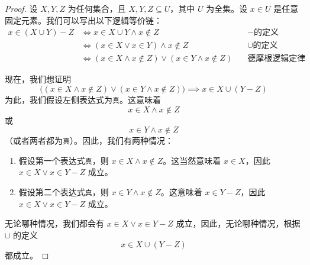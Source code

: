 \begin{proof}
    设 $X,Y,Z$ 为任何集合，且 $X,Y,Z \subseteq U$，其中 $U$ 为全集。设 $x \in U$ 是任意固定元素。我们可以写出以下逻辑等价链：
    \begin{align*}
        x \in (X \cup Y ) - Z &\iff x \in X \cup Y \land x \notin Z &\quad - \text{的定义}\\
        &\iff (x \in X \lor x \in Y ) \land x \notin Z &\quad \cup \text{的定义} \\
        &\iff (x \in X \land x \notin Z) \lor (x \in Y \land x \notin Z) &\quad \text{德摩根逻辑定律} 
    \end{align*}
    
    \setlength{\fboxrule}{2pt}
    \setlength\fboxsep{5mm}
    \begin{center}
    \end{center}
    现在，我们想证明
    \[\big((x \in X \land x \notin Z) \lor (x \in Y \land x \notin Z)\big) \implies x \in X \cup (Y - Z)\]
    为此，我们假设左侧表达式为\verb|真|。这意味着
    \[x \in X \land x \notin Z\]
    或
    \[x \in Y \land x \notin Z\]
    （或者两者都为\verb|真|）。因此，我们有两种情况：
    \begin{enumerate}
        \item 假设第一个表达式\verb|真|，则 $x \in X \land x \notin Z$。这当然意味着 $x \in X$，因此 $x \in X \lor x \in Y - Z$ 成立。
        \item 假设第二个表达式\verb|真|，则 $x \in Y \land x \notin Z$。这意味着 $x \in Y - Z$，因此 $x \in X \lor x \in Y - Z$ 成立。
    \end{enumerate}
    无论哪种情况，我们都会有 $x \in X \lor x \in Y - Z$ 成立，因此，无论哪种情况，根据 $\cup$ 的定义
    \[x \in X \cup (Y - Z)\]
    都成立。


\end{proof}

